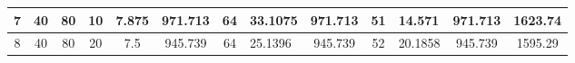 \documentclass[12pt, a4paper]{article}
\begin{document}
\begin{table}[H]
\begin{tabular}{|c|c|c|c|c|c|c|l|c|c|l|c|c|}
		7                 & 40                        & 80                         & 10                         & 7.875                & 971.713  & 64                                                                      & 33.1075                                                & 971.713  & 51                                                                      & 14.571                                                 & 971.713                        & 1623.74                        \\ \hline
		8                 & 40                        & 80                         & 20                         & 7.5                  & 945.739  & 64                                                                      & 25.1396                                                & 945.739  & 52                                                                      & 20.1858                                                & 945.739                        & 1595.29                        \\ \hline
	\end{tabular}
	\label{tab:res_micro_indep}
\end{table}
\end{document}
